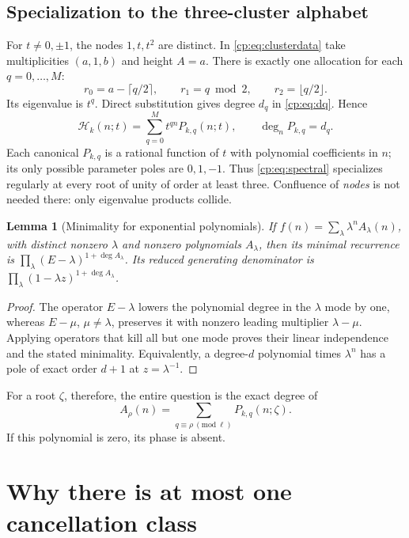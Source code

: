 \documentclass[11pt]{article}
\newtheorem{lemma}[theorem]{Lemma}
\theoremstyle{definition}
\theoremstyle{remark}
\newcommand{\Ht}{\mathcal H}
\theoremstyle{definition}
\theoremstyle{plain}
\numberwithin{equation}{section}
\begin{document}
\subsection{Specialization to the three-cluster alphabet}
For $t\ne0,\pm1$, the nodes $1,t,t^2$ are distinct. In
\eqref{cp:eq:clusterdata} take multiplicities $(a,1,b)$ and height $A=a$.
There is exactly one allocation for each $q=0,\ldots,M$:
\begin{equation}
 r_0=a-\lceil q/2\rceil,\qquad r_1=q\bmod2,\qquad r_2=\lfloor q/2\rfloor.
 \label{cp:eq:allocation}
\end{equation}
Its eigenvalue is $t^q$. Direct substitution gives degree $d_q$ in
\eqref{cp:eq:dq}. Hence
\begin{equation}
 \Ht_k(n;t)=\sum_{q=0}^{M}t^{qn}P_{k,q}(n;t),\qquad
 \deg_nP_{k,q}=d_q.
 \label{cp:eq:spectral}
\end{equation}
Each canonical $P_{k,q}$ is a rational function of $t$ with polynomial
coefficients in $n$; its only possible parameter poles are $0,1,-1$.
Thus \eqref{cp:eq:spectral} specializes regularly at every root of unity
of order at least three. Confluence of \emph{nodes} is not needed there:
only eigenvalue products collide.

\begin{lemma}[Minimality for exponential polynomials]
\label{cp:lem:minimality}
If $f(n)=\sum_\lambda\lambda^n A_\lambda(n)$, with distinct nonzero
$\lambda$ and nonzero polynomials $A_\lambda$, then its minimal recurrence
is $\prod_\lambda(E-\lambda)^{1+\deg A_\lambda}$.
Its reduced generating denominator is
$\prod_\lambda(1-\lambda z)^{1+\deg A_\lambda}$.
\end{lemma}
\begin{proof}
The operator $E-\lambda$ lowers the polynomial degree in the $\lambda$
mode by one, whereas $E-\mu$, $\mu\ne\lambda$, preserves it with
nonzero leading multiplier $\lambda-\mu$. Applying operators that kill
all but one mode proves their linear independence and the stated
minimality. Equivalently, a degree-$d$ polynomial times $\lambda^n$
has a pole of exact order $d+1$ at $z=\lambda^{-1}$.
\end{proof}
For a root $\zeta$, therefore, the entire question is the exact degree of
\begin{equation}
 A_\rho(n)=\sum_{q\equiv\rho\ (\mathrm{mod}\ \ell)}P_{k,q}(n;\zeta).
 \label{cp:eq:grouped}
\end{equation}
If this polynomial is zero, its phase is absent.

\section{Why there is at most one cancellation class}
\label{cp:sec:reflection}
\end{document}
